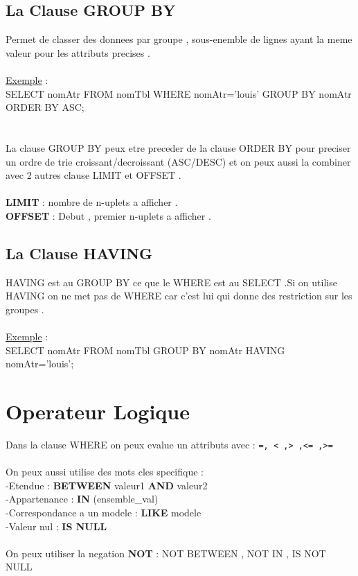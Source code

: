 \documentclass[a4paper,12pt,openany]{book}
\begin{document}
\subsection{La Clause GROUP BY}
Permet de classer des donnees par groupe , sous-enemble de lignes ayant la meme valeur pour les attributs precises .\\
\\
\underline{Exemple} : \\
SELECT nomAtr FROM nomTbl WHERE nomAtr='louis'  GROUP BY nomAtr ORDER BY ASC;\\
\\
\\
La clause GROUP BY peux etre preceder de la clause ORDER BY pour preciser un ordre de trie croissant/decroissant (ASC/DESC) et on peux aussi la combiner avec 2 autres clause LIMIT et OFFSET .\\
\\
\textbf{LIMIT} : nombre de n-uplets a afficher .\\
\textbf{OFFSET} : Debut , premier n-uplets a afficher .\\

\subsection{La Clause HAVING}
HAVING est au GROUP BY ce que le WHERE est au SELECT .Si on utilise HAVING on ne met pas de WHERE car c'est lui qui donne des restriction sur les groupes .\\
\\
\underline{Exemple} : \\
SELECT nomAtr FROM nomTbl GROUP BY nomAtr HAVING nomAtr='louis';\\

\section{Operateur Logique}
Dans la clause WHERE on peux evalue un attributs avec : \verb+=, < ,> ,<= ,>=+ \\
\\
On peux aussi utilise des mots cles specifique :\\
-Etendue : \textbf{BETWEEN} valeur1 \textbf{AND} valeur2 \\
-Appartenance : \textbf{IN} (ensemble\_val) \\
-Correspondance a un modele : \textbf{LIKE} modele \\
-Valeur nul : \textbf{IS NULL}\\
\\
On peux utiliser la negation \textbf{NOT}  : NOT BETWEEN , NOT IN , IS NOT NULL \\
\end{document}
